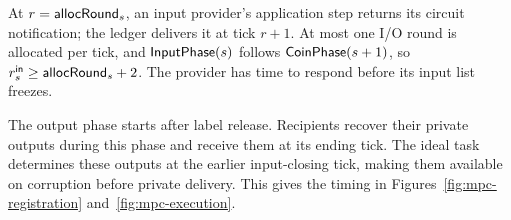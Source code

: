 At $r=\mathsf{allocRound}_s$, an input provider's application step returns its
circuit notification; the ledger delivers it at tick $r+1$.
At most one I/O round is allocated per tick, and $\mathsf{InputPhase}(s)$ follows
$\mathsf{CoinPhase}(s+1)$, so $r_s^{\mathsf{in}}\geq\mathsf{allocRound}_s+2$.
The provider has time to respond before its input list freezes.

The output phase starts after label release.  Recipients recover their
private outputs during this phase and receive them at its ending tick.
The ideal task determines these outputs at the earlier input-closing
tick, making them available on corruption before private delivery.
This gives the timing in Figures~\ref{fig:mpc-registration}
and~\ref{fig:mpc-execution}.

